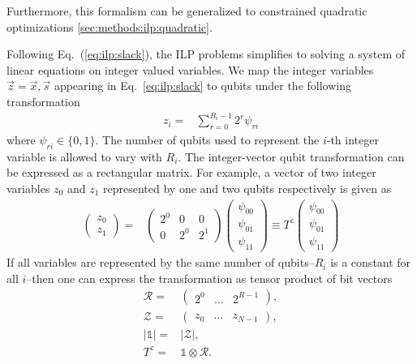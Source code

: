 \documentclass[10pt]{iopart}
\begin{document}
Furthermore, this formalism can be generalized to constrained quadratic optimizations \ref{sec:methods:ilp:quadratic}.

Following Eq.~(\ref{eq:ilp:slack}), the ILP problems simplifies to solving a system of linear equations on integer valued variables. We map the integer variables $\vec z = \vec x, \vec s$ appearing in Eq.~\eqref{eq:ilp:slack} to qubits under the following transformation~\cite{Chang:2018uoc}
\begin{align}
 z_i = & \sum_{r=0}^{R_i-1} 2^r \psi_{ri}
 \label{eq:int_to_bin}
\end{align}
where $\psi_{ri} \in \{0, 1\}$. The number of qubits used to represent the $i$-th integer variable is allowed to vary with $R_i$.
The integer-vector qubit transformation can be expressed as a rectangular matrix.
For example, a vector of two integer variables $z_0$ and $z_1$ represented by one and two qubits respectively is given as
\begin{align}
 \begin{pmatrix}
  z_0 \\
  z_1
 \end{pmatrix}
 = &
 \begin{pmatrix}
  2^0 & 0   & 0   \\
  0   & 2^0 & 2^1
 \end{pmatrix}
 \begin{pmatrix}
  \psi_{00} \\
  \psi_{01} \\
  \psi_{11}
 \end{pmatrix}
 \equiv T^z \begin{pmatrix}
  \psi_{00} \\
  \psi_{01} \\
  \psi_{11}
 \end{pmatrix}
\end{align}
If all variables are represented by the same number of qubits--$R_i$ is a constant for all $i$--then one can express the transformation as tensor product of bit vectors
\begin{align}
 \mathcal{R} =  & \begin{pmatrix} 2^0 & \dots & 2^{R-1}\end{pmatrix},    \\
 \mathcal{Z} =  & \begin{pmatrix} z_0 & \dots & z_{N-1}\end{pmatrix},    \\
 |\mathds{1}| = & |\mathcal{Z}|,                 \\
 T^z =          & \mathds{1}\otimes \mathcal{R}.
\end{align}
\end{document}
